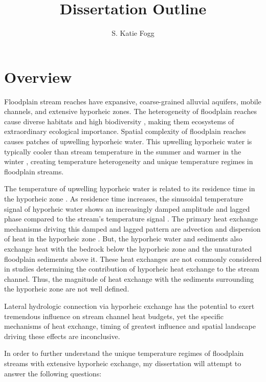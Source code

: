 \documentclass[a4paper]{article}
\title{Dissertation Outline}
\author{S. Katie Fogg}
\begin{document}
\maketitle

\section*{Overview}
Floodplain stream reaches have expansive, coarse-grained alluvial aquifers, mobile channels, and extensive hyporheic zones. The heterogeneity of floodplain reaches cause diverse habitats and high biodiversity \parencite{Hauer2016Gravel-bedLandscapes}, making them ecosystems of extraordinary ecological importance. Spatial complexity of floodplain reaches causes patches of upwelling hyporheic water. This upwelling hyporheic water is typically cooler than stream temperature in the summer and warmer in the winter \parencite{Fogg2017ThermalPatterns, Poole2001AnDegradation}, creating temperature heterogeneity and unique temperature regimes in floodplain streams. 

The temperature of upwelling hyporheic water is related to its residence time in the hyporheic zone \parencite{Cardenas2008ResidenceExchange, Gooseff2005DeterminingOregon}. As residence time increases, the sinusoidal temperature signal of hyporheic water shows an increasingly damped amplitude and lagged phase compared to the stream's temperature signal \parencite{Arrigoni2008BufferedChannels, Fogg2017ThermalPatterns}. The primary heat exchange mechanisms driving this damped and lagged pattern are advection and dispersion of heat in the hyporheic zone \parencite{Cardenas2015HyporheicProspectus}. But, the hyporheic water and sediments also exchange heat with the bedrock below the hyporheic zone and the unsaturated floodplain sediments above it. These heat exchanges are not commonly considered in studies determining the contribution of hyporheic heat exchange to the stream channel. Thus, the magnitude of heat exchange with the sediments surrounding the hyporheic zone are not well defined.

Lateral hydrologic connection via hyporheic exchange has the potential to exert tremendous influence on stream channel heat budgets, yet the specific mechanisms of heat exchange, timing of greatest influence and spatial landscape driving these effects are inconclusive. 

In order to further understand the unique temperature regimes of floodplain streams with extensive hyporheic exchange, my dissertation will attempt to answer the following questions:
\end{document}
